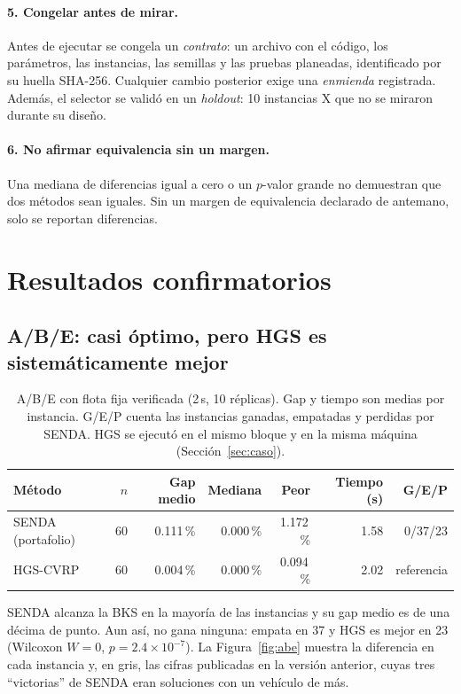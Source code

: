 \documentclass[11pt,a4paper]{article}
\newcommand{\senda}{SENDA}
\begin{document}
\paragraph{5. Congelar antes de mirar.} Antes de ejecutar se congela un \emph{contrato}: un archivo
con el código, los parámetros, las instancias, las semillas y las pruebas planeadas, identificado por
su huella SHA-256. Cualquier cambio posterior exige una \emph{enmienda} registrada. Además, el
selector se validó en un \emph{holdout}: 10 instancias X que no se miraron durante su diseño.

\paragraph{6. No afirmar equivalencia sin un margen.} Una mediana de diferencias igual a cero o un
$p$-valor grande no demuestran que dos métodos sean iguales. Sin un margen de equivalencia declarado
de antemano, solo se reportan diferencias.

\section{Resultados confirmatorios}
\label{sec:resultados}

\subsection{A/B/E: casi óptimo, pero HGS es sistemáticamente mejor}

\begin{table}[H]
\centering
\caption{A/B/E con flota fija verificada (2\,s, 10 réplicas). Gap y tiempo son medias por
instancia. G/E/P cuenta las instancias ganadas, empatadas y perdidas por SENDA. HGS se ejecutó en el
mismo bloque y en la misma máquina (Sección~\ref{sec:caso}).}
\label{tab:abe}
\small
\begin{tabular}{@{}lrrrrrr@{}}
\toprule
Método & $n$ & Gap medio & Mediana & Peor & Tiempo (s) & G/E/P \\
\midrule
\senda{} (portafolio) & 60 & 0.111\,\% & 0.000\,\% & 1.172\,\% & 1.58 & 0/37/23 \\
HGS-CVRP        & 60 & 0.004\,\% & 0.000\,\% & 0.094\,\% & 2.02 & referencia \\
\bottomrule
\end{tabular}
\end{table}

SENDA alcanza la BKS en la mayoría de las instancias y su gap medio es de una décima de punto. Aun así,
no gana ninguna: empata en 37 y HGS es mejor en 23 (Wilcoxon $W=0$, $p=2.4\times10^{-7}$). La
Figura~\ref{fig:abe} muestra la diferencia en cada instancia y, en gris, las cifras publicadas en la
versión anterior, cuyas tres ``victorias'' de SENDA eran soluciones con un vehículo de más.
\end{document}
